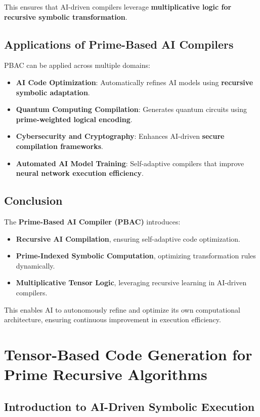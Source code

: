 \documentclass{article}
\theoremstyle{plain}
\theoremstyle{plain}
\theoremstyle{definition}
\theoremstyle{remark}
\begin{document}
This ensures that AI-driven compilers leverage \textbf{multiplicative logic for recursive symbolic transformation}.

\subsection{Applications of Prime-Based AI Compilers}

PBAC can be applied across multiple domains:
\begin{itemize}
    \item \textbf{AI Code Optimization}: Automatically refines AI models using \textbf{recursive symbolic adaptation}.
    \item \textbf{Quantum Computing Compilation}: Generates quantum circuits using \textbf{prime-weighted logical encoding}.
    \item \textbf{Cybersecurity and Cryptography}: Enhances AI-driven \textbf{secure compilation frameworks}.
    \item \textbf{Automated AI Model Training}: Self-adaptive compilers that improve \textbf{neural network execution efficiency}.
\end{itemize}

\subsection{Conclusion}

The \textbf{Prime-Based AI Compiler (PBAC)} introduces:
\begin{itemize}
    \item \textbf{Recursive AI Compilation}, ensuring self-adaptive code optimization.
    \item \textbf{Prime-Indexed Symbolic Computation}, optimizing transformation rules dynamically.
    \item \textbf{Multiplicative Tensor Logic}, leveraging recursive learning in AI-driven compilers.
\end{itemize}

This enables AI to autonomously refine and optimize its own computational architecture, ensuring continuous improvement in execution efficiency.
\section{Tensor-Based Code Generation for Prime Recursive Algorithms}

\subsection{Introduction to AI-Driven Symbolic Execution}
\end{document}
